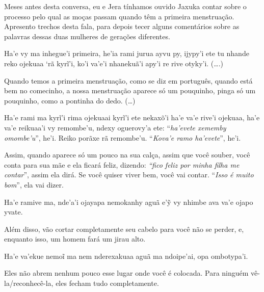 \indent
Meses antes desta conversa, eu e Jera tínhamos ouvido Jaxuka contar
sobre o processo pelo qual as moças passam quando têm a primeira
menstruação. Apresento trechos desta fala, para depois tecer alguns
comentários sobre as palavras dessas duas mulheres de gerações
diferentes. 

\bigskip

\begin{paracol}{2}
\footnotesize
\vspace*{0.17cm}

\noindent
Ha’e vy ma inhegue’i primeira, he’ia rami jurua ayvu py, ijypy’i ete tu
nhande reko ojekuaa ‘rã kyrĩ’i, ko’i va’e’i nhanekuã’i apy’i re rive
otyky’i. (\ldots{}.)

\bigskip

\switchcolumn
\noindent
Quando temos a primeira menstruação, como se diz em português, quando
está bem no comecinho, a nossa menstruação aparece só um pouquinho,
pinga só um pouquinho, como a pontinha do dedo. (\ldots{})

\smallskip

\switchcolumn
\medskip
\noindent
Ha'e rami ma kyrĩ'i rima ojekuaai kyrĩ'i ete nekaxõ'i ha'e va'e rive'i
ojekuaa, ha'e va'e reikuaa'i vy remombe'u, ndexy oguerovy'a ete:
``\emph{ha'evete xememby omombe'u}'', he'i. Reiko porãxe rã remombe'u.
``\emph{Kova'e ramo ha'evete}'', he'i.

\bigskip

\switchcolumn
\noindent
Assim, quando aparece só um pouco na sua calça, assim que você souber,
você conta para sua mãe e ela ficará feliz, dizendo: \emph{``fico feliz
por minha filha me contar}'', assim ela dirá. Se você quiser viver bem,
você vai contar. ``\emph{Isso é muito bom}'', ela vai dizer.

\smallskip

\switchcolumn
\medskip
\noindent
Ha'e ramive ma, nde'a'i ojayapa nemokanhy aguã e'ỹ vy nhimbe ava va'e
ojapo yvate.

\bigskip

\switchcolumn
\noindent
Além disso, vão cortar completamente seu cabelo para você não se perder,
e, enquanto isso, um homem fará um jirau alto. 

\smallskip

\switchcolumn
\medskip
\noindent
Ha’e va’ekue nemoĩ ma nem nderexakuaa aguã ma ndoipe’ai, opa
ombotypa’i. 

\bigskip

\switchcolumn
\noindent
Eles não abrem nenhum pouco esse lugar onde você é colocada. Para
ninguém vê-la/reconhecê-la, eles fecham tudo completamente.


\end{paracol}
